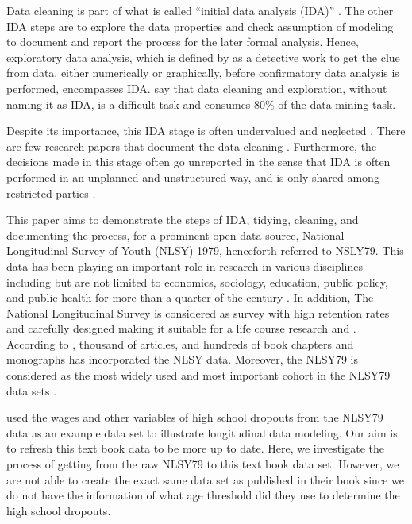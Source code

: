 Data cleaning is part of what is called ``initial data analysis (IDA)''
\citep{Chatfield1985TIEo}. The other IDA steps are to explore the data
properties and check assumption of modeling to document and report the
process for the later formal analysis. Hence, exploratory data analysis,
which is defined by \citet{tukey} as a detective work to get the clue
from data, either numerically or graphically, before confirmatory data
analysis is performed, encompasses IDA. \citet{DasuTamraparni2003Edma}
say that data cleaning and exploration, without naming it as IDA, is a
difficult task and consumes 80\% of the data mining task.

Despite its importance, this IDA stage is often undervalued and
neglected \citep{Chatfield1985TIEo}. There are few research papers that
document the data cleaning \citep{WickhamHadley2014TD}. Furthermore, the
decisions made in this stage often go unreported in the sense that IDA
is often performed in an unplanned and unstructured way, and is only
shared among restricted parties \citep{HuebnerMarianne2020Haar}.

This paper aims to demonstrate the steps of IDA, tidying, cleaning, and
documenting the process, for a prominent open data source, National
Longitudinal Survey of Youth (NLSY) 1979, henceforth referred to NSLY79.
This data has been playing an important role in research in various
disciplines including but are not limited to economics, sociology,
education, public policy, and public health for more than a quarter of
the century \citep{MichaelRPergamit2001DWTN}. In addition, The National
Longitudinal Survey is considered as survey with high retention rates
and carefully designed making it suitable for a life course research
\citep{MichaelRPergamit2001DWTN} and \citep{eliznlsy}. According to
\citet{eliznlsy}, thousand of articles, and hundreds of book chapters
and monographs has incorporated the NLSY data. Moreover, the NLSY79 is
considered as the most widely used and most important cohort in the
NLSY79 data sets \citep{MichaelRPergamit2001DWTN}.

\citet{SingerJudithD2003Alda} used the wages and other variables of high
school dropouts from the NLSY79 data as an example data set to
illustrate longitudinal data modeling. Our aim is to refresh this text
book data to be more up to date. Here, we investigate the process of
getting from the raw NLSY79 to this text book data set. However, we are
not able to create the exact same data set as published in their book
since we do not have the information of what age threshold did they use
to determine the high school dropouts.


